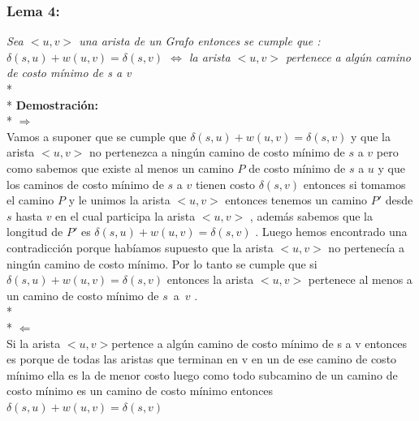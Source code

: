 \documentclass{article}
\begin{document}
     
    \subsubsection{Lema 4:}
    \textit{Sea $<u,v>$ una arista de un Grafo entonces se cumple que :\\
    $\delta\left(s,u\right) + w \left(u,v\right) = \delta\left(s,v\right)$ $\Longleftrightarrow$ la arista $<u,v>$ pertenece 
    a alg\'un camino de costo m\'inimo de s a v}
    \\*
    \\*
    \noindent \textbf{Demostraci\'on:}
    \\*
    $\Longrightarrow$\\
    Vamos a suponer que  se cumple que $\delta\left(s,u\right) + w \left(u,v\right) = \delta\left(s,v\right)$ y que la arista $<u,v>$ no pertenezca 
    a ning\'un camino de costo m\'inimo  de $s$ a $v$ pero como sabemos que existe al menos un camino $P$ de costo m\'inimo de $s$ a $u$  y que los caminos de costo m\'inimo de 
    $s$ a $v$ tienen costo $\delta\left(s,v\right)$ entonces si tomamos el camino $P$  y le unimos la arista $<u,v>$ entonces tenemos un camino $P'$ desde $s$ hasta $v$ en el cual participa la arista $<u,v>$ , 
    adem\'as sabemos que la longitud de $P'$ es $\delta\left(s,u\right) + w \left(u,v\right) = \delta\left(s,v\right)$ . Luego hemos encontrado una contradicci\'on porque hab\'iamos supuesto que la 
    arista $<u,v>$ no pertenec\'ia a ning\'un camino de costo m\'inimo. Por lo tanto se cumple que si $\delta\left(s,u\right) + w \left(u,v\right) = \delta\left(s,v\right)$ entonces la arista $<u,v>$ 
    pertenece al menos a un camino de costo m\'inimo de $s$~a~$v$ . 
    \\*
    \\*
    \noindent $\Longleftarrow $\\
    Si la arista $<u,v>$pertence a alg\'un camino de costo m\'inimo de s a v  entonces es porque de todas las aristas que terminan en v en un 
    de ese camino de costo m\'inimo ella es la de menor costo luego como todo subcamino de un camino de costo m\'inimo es un camino de costo 
    m\'inimo entonces$\delta\left(s,u\right) + w \left(u,v\right) = \delta\left(s,v\right)$ \\

    
\end{document}
